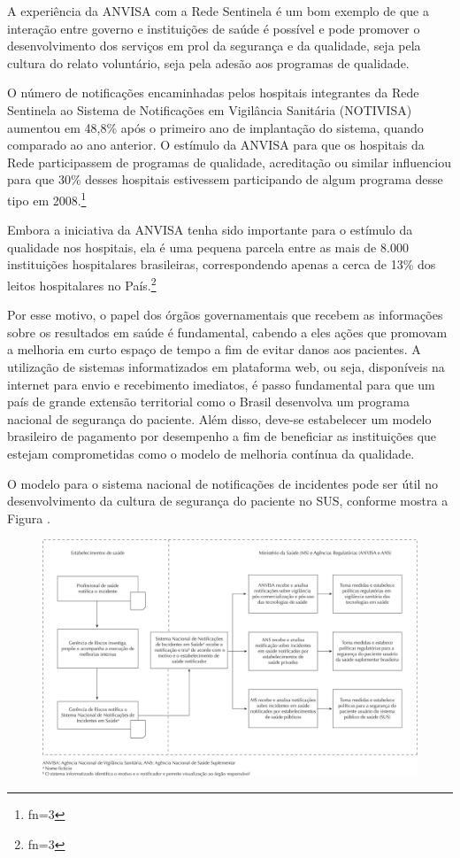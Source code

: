 \documentclass{article}
\makeatletter
\newcommand{\fn}{\afterassignment\fn@aux\count0=}
\newcommand{\fn@aux}{\csname fn\the\count0\endcsname}
\makeatother
\begin{document}
A experiência da ANVISA com a Rede Sentinela é um bom exemplo de que a interação
entre
governo e instituições de saúde é possível e pode promover o desenvolvimento dos
serviços em
prol da segurança e da qualidade, seja pela cultura do relato voluntário, seja
pela adesão
aos programas de qualidade.

O número de notificações encaminhadas pelos hospitais integrantes da Rede
Sentinela ao
Sistema de Notificações em Vigilância Sanitária (NOTIVISA) aumentou em 48,8\%
após o primeiro
ano de implantação do sistema, quando comparado ao ano anterior. O estímulo da
ANVISA para
que os hospitais da Rede participassem de programas de qualidade, acreditação ou
similar
influenciou para que 30\% desses hospitais estivessem participando de algum
programa desse
tipo em 2008.\footnote{\fn3}

Embora a iniciativa da ANVISA tenha sido importante para o estímulo da qualidade
nos
hospitais, ela é uma pequena parcela entre as mais de 8.000 instituições
hospitalares
brasileiras, correspondendo apenas a cerca de 13\% dos leitos hospitalares no
País.\footnote{\fn3}

Por esse motivo, o papel dos órgãos governamentais que recebem as informações
sobre os
resultados em saúde é fundamental, cabendo a eles ações que promovam a melhoria
em curto
espaço de tempo a fim de evitar danos aos pacientes. A utilização de sistemas
informatizados
em plataforma web, ou seja, disponíveis na internet para envio e recebimento
imediatos, é
passo fundamental para que um país de grande extensão territorial como o Brasil
desenvolva
um programa nacional de segurança do paciente. Além disso, deve-se estabelecer
um modelo
brasileiro de pagamento por desempenho a fim de beneficiar as instituições que
estejam
comprometidas como o modelo de melhoria contínua da qualidade.

O modelo para o sistema nacional de notificações de incidentes pode ser útil no
desenvolvimento da cultura de segurança do paciente no SUS, conforme mostra a
Figura .

\begin{figure}
\includegraphics[width=\textwidth]{0034-8910-rsp-47-04-0791-gf01}
\caption{}
\end{figure}
\end{document}
